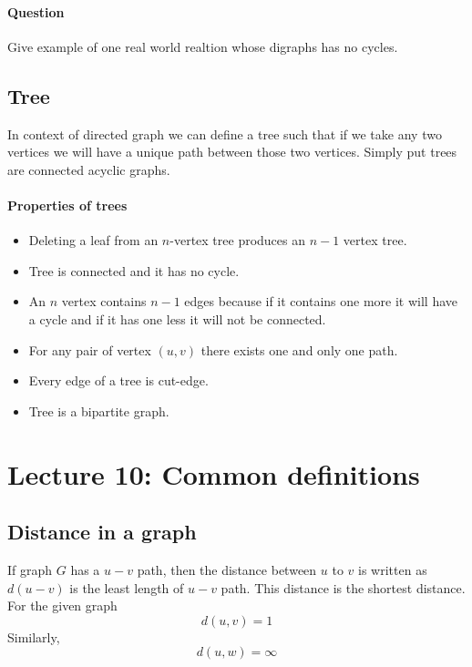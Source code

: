 \paragraph{Question}Give example of one real world realtion whose digraphs has no cycles.


\subsection{Tree}
In context of directed graph we can define a tree such that if we take any two vertices we will have a unique path between those two vertices. Simply put trees are connected acyclic graphs.


\paragraph{Properties of trees}\begin{itemize}
    \item Deleting a leaf from an $n$-vertex tree produces an $n-1$ vertex tree.
    \item Tree is connected and it has no cycle.
    \item An $n$ vertex contains $n-1$ edges because if it contains one more it will have a cycle and if it has one less it will not be connected. 
    \item For any pair of vertex $(u, v)$ there exists one and only one path.
    \item Every edge of a tree is cut-edge.
    \item Tree is a bipartite graph.
\end{itemize}

\section{Lecture 10: Common definitions}

\subsection{Distance in a graph}
If graph $G$ has a $u-v$ path, then the distance between $u$ to $v$ is written as $d(u-v)$ is the least length of $u-v$ path. This distance is the shortest distance. For the given graph
\begin{equation}
    {\textstyle d(u,v) = 1} 
 \end{equation}
Similarly,
\begin{equation}
    {\textstyle d(u,w) = \infty} 
 \end{equation}

